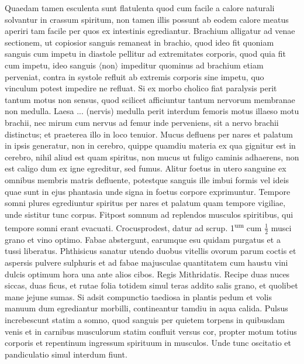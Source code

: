 \pend%
\pstart%
Quaedam tamen esculenta sunt flatulenta quod cum facile a calore naturali solvantur in crassum spiritum, non tamen illis possunt ab eodem calore meatus aperiri tam facile per quos ex intestinis egrediantur.
\pend%
\pstart%
Brachium alligatur ad venae sectionem, ut copiosior sanguis remaneat in brachio, quod ideo fit quoniam sanguis cum impetu in diastole pellitur ad extremitates corporis, quod quia fit cum impetu, ideo sanguis $\langle$non$\rangle$ impeditur quominus ad brachium etiam perveniat, contra in systole refluit ab extremis corporis sine impetu, quo vinculum potest impedire ne refluat.
\pend%
\pstart%
Si ex morbo cholico fiat paralysis perit tantum motus non sensus, quod scilicet afficiuntur tantum nervorum membranae non medulla.
\pend%
\pstart%
Laesa ... (nervis) medulla perit interdum femoris motus illaeso motu brachii, nec mirum cum nervus ad femur inde perveniens, sit a nervo brachii distinctus; et praeterea illo in loco tenuior.
\pend%
\pstart%
Mucus defluens per nares et palatum in ipsis generatur, non in cerebro, quippe quamdiu materia ex qua gignitur est in cerebro, nihil aliud est quam spiritus, non mucus ut fuligo caminis adhaerens, non est caligo dum ex igne egreditur, sed fumus.
\pend%
\pstart%
Alitur foetus in utero sanguine ex omnibus membris matris defluente, potest\-que sanguis ille imbui formis vel ideis quae sunt in ejus phantasia unde signa in foetus corpore exprimuntur.
\pend%
\pstart%
Tempore somni plures egrediuntur spiritus per nares et palatum quam tempore vigiliae, unde sistitur tunc corpus. Fitpost somnum ad replendos musculos spiritibus, qui tempore somni erant evacuati.
\pend%
\pstart%
Crocusprodest, datur ad scrup. 1\textsuperscript{um} cum $\displaystyle\frac{1}{2}$ musci grano et vino optimo.
\pend%
\pstart%
Fabae abstergunt, earumque esu quidam purgatus et a tussi liberatus.
\pend
\pstart%
Phthisicus sanatur utendo duobus vitellis ovorum parum coctis et aspersis pulvere sulphuris et
ad fabae majusculae quantitatem cum haustu vini dulcis optimum hora una ante alios cibos.%
%
 Regis Mithridatis.\protect{}
Recipe duas nuces siccas, duas ficus, et rutae folia totidem simul teras addito salis grano, et quolibet mane jejune sumas.
\pend%
\pstart%
Si adsit compunctio taediosa in plantis pedum et volis manuum dum egrediantur morbilli, contineantur tamdiu in aqua calida. Pulsus increbescunt statim a somno, quod sanguis per quietem torpens in quibusdam venis et in carnibus musculorum statim confluit versus cor, propter motum totius corporis et repentinum ingressum spirituum in musculos. Unde tunc oscitatio et pandiculatio simul interdum fiunt.
